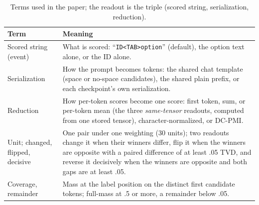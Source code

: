 \begin{table}[t]
\centering\scriptsize
\setlength{\tabcolsep}{3pt}
\begin{tabular}{@{}>{\raggedright\arraybackslash}p{1.9cm}p{5.55cm}@{}}
\toprule
Term & Meaning \\
\midrule
Scored string (event) & What is scored: ``\texttt{ID<TAB>option}'' (default), the option text alone, or the ID alone. \\
Serialization & How the prompt becomes tokens: the shared chat template (space or no-space candidates), the shared plain prefix, or each checkpoint's own serialization. \\
Reduction & How per-token scores become one score: first token, sum, or per-token mean (the three \emph{same-tensor} readouts, computed from one stored tensor), character-normalized, or DC-PMI. \\
Unit; changed, flipped, decisive & One pair under one weighting (30 units); two readouts change it when their winners differ, flip it when the winners are opposite with a paired difference of at least .05 TVD, and reverse it decisively when the winners are opposite and both gaps are at least .05. \\
Coverage, remainder & Mass at the label position on the distinct first candidate tokens; full-mass at .5 or more, a remainder below .05. \\
\bottomrule
\end{tabular}
\caption{Terms used in the paper; the readout is the triple (scored string, serialization, reduction).}
\label{tab:glossary}
\end{table}

